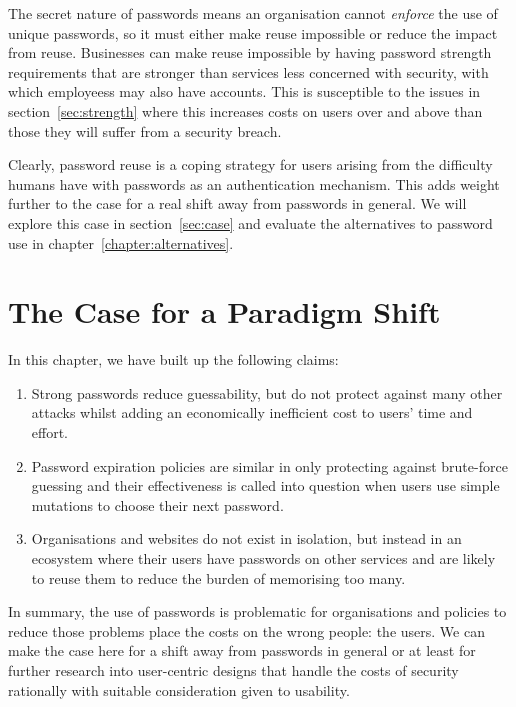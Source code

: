 \documentclass{report}
\begin{document}
The secret nature of passwords means an organisation cannot \emph{enforce}
the use of unique passwords, so it must either make reuse impossible or
reduce the impact from reuse. Businesses can make reuse impossible
by having password strength requirements that are stronger than
services less concerned with security, with which employeess may also have
accounts. This is susceptible to the issues in section~\ref{sec:strength}
where this increases costs on users over and above than those they will
suffer from a security breach.

Clearly, password reuse is a coping strategy for users arising from the
difficulty humans have with passwords as an authentication mechanism. This
adds weight further to the case for a real shift away from passwords in
general. We will explore this case in section~\ref{sec:case} and evaluate
the alternatives to password use in chapter~\ref{chapter:alternatives}.

\section{The Case for a Paradigm Shift}

In this chapter, we have built up the following claims:

\begin{enumerate}
  \item Strong passwords reduce guessability, but do not protect against
    many other attacks whilst adding an economically inefficient cost to users'
    time and effort.
  \item Password expiration policies are similar in only protecting against
    brute-force guessing and their effectiveness is called into question when
    users use simple mutations to choose their next password.
  \item Organisations and websites do not exist in isolation, but instead in
    an ecosystem where their users have passwords on other services and are likely
    to reuse them to reduce the burden of memorising too many.
\end{enumerate}

In summary, the use of passwords is problematic for organisations and policies
to reduce those problems place the costs on the wrong people: the users. We can
make the case here for a shift away from passwords in general or at least
for further research into user-centric designs that handle the costs of security
rationally with suitable consideration given to usability.
\end{document}
